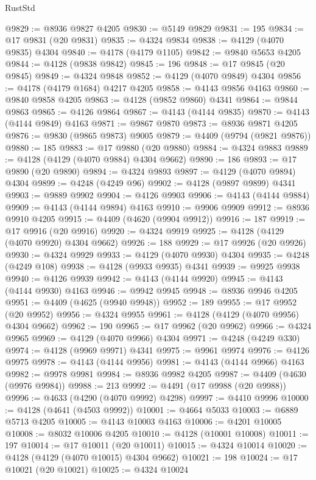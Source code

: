 \begin{lexlean}{RustStd}
\begin{coremodule}
@9829 := @8936 @9827 @4205
@9830 := @5149 @9829
@9831 := 195
@9834 := @17 @9831 (@20 @9831)
@9835 := @4324 @9834
@9838 := @4129 (@4070 @9835) @4304
@9840 := @4178 (@4179 @1105)
@9842 := @9840 @5653 @4205
@9844 := @4128 (@9838 @9842)
@9845 := 196
@9848 := @17 @9845 (@20 @9845)
@9849 := @4324 @9848
@9852 := @4129 (@4070 @9849) @4304
@9856 := @4178 (@4179 @1684) @4217 @4205
@9858 := @4143 @9856 @4163
@9860 := @9840 @9858 @4205
@9863 := @4128 (@9852 @9860) @4341
@9864 := @9844 @9863
@9865 := @4126 @9864
@9867 := @4143 (@4144 @9835)
@9870 := @4143 (@4144 @9849) @4163
@9871 := @9867 @9870
@9873 := @8936 @9871 @4205
@9876 := @9830 (@9865 @9873) @9005
@9879 := @4409 (@9794 (@9821 @9876))
@9880 := 185
@9883 := @17 @9880 (@20 @9880)
@9884 := @4324 @9883
@9889 := @4128 (@4129 (@4070 @9884) @4304 @9662)
@9890 := 186
@9893 := @17 @9890 (@20 @9890)
@9894 := @4324 @9893
@9897 := @4129 (@4070 @9894) @4304
@9899 := @4248 (@4249 @96)
@9902 := @4128 (@9897 @9899) @4341
@9903 := @9889 @9902
@9904 := @4126 @9903
@9906 := @4143 (@4144 @9884)
@9909 := @4143 (@4144 @9894) @4163
@9910 := @9906 @9909
@9912 := @8936 @9910 @4205
@9915 := @4409 (@4620 (@9904 @9912))
@9916 := 187
@9919 := @17 @9916 (@20 @9916)
@9920 := @4324 @9919
@9925 := @4128 (@4129 (@4070 @9920) @4304 @9662)
@9926 := 188
@9929 := @17 @9926 (@20 @9926)
@9930 := @4324 @9929
@9933 := @4129 (@4070 @9930) @4304
@9935 := @4248 (@4249 @108)
@9938 := @4128 (@9933 @9935) @4341
@9939 := @9925 @9938
@9940 := @4126 @9939
@9942 := @4143 (@4144 @9920)
@9945 := @4143 (@4144 @9930) @4163
@9946 := @9942 @9945
@9948 := @8936 @9946 @4205
@9951 := @4409 (@4625 (@9940 @9948))
@9952 := 189
@9955 := @17 @9952 (@20 @9952)
@9956 := @4324 @9955
@9961 := @4128 (@4129 (@4070 @9956) @4304 @9662)
@9962 := 190
@9965 := @17 @9962 (@20 @9962)
@9966 := @4324 @9965
@9969 := @4129 (@4070 @9966) @4304
@9971 := @4248 (@4249 @330)
@9974 := @4128 (@9969 @9971) @4341
@9975 := @9961 @9974
@9976 := @4126 @9975
@9978 := @4143 (@4144 @9956)
@9981 := @4143 (@4144 @9966) @4163
@9982 := @9978 @9981
@9984 := @8936 @9982 @4205
@9987 := @4409 (@4630 (@9976 @9984))
@9988 := 213
@9992 := @4491 (@17 @9988 (@20 @9988))
@9996 := @4633 (@4290 (@4070 @9992) @4298)
@9997 := @4410 @9996
@10000 := @4128 (@4641 (@4503 @9992))
@10001 := @4664 @5033
@10003 := @6889 @5713 @4205
@10005 := @4143 @10003 @4163
@10006 := @4201 @10005
@10008 := @8032 @10006 @4205
@10010 := @4128 (@10001 @10008)
@10011 := 197
@10014 := @17 @10011 (@20 @10011)
@10015 := @4324 @10014
@10020 := @4128 (@4129 (@4070 @10015) @4304 @9662)
@10021 := 198
@10024 := @17 @10021 (@20 @10021)
@10025 := @4324 @10024

\end{coremodule}
\end{lexlean}
